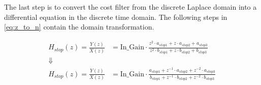     \startexplain
    \stopexplain

The last step is to convert the cost filter from the discrete Laplace domain into a differential equation in the discrete time domain. The following steps in \autoref{eq:z_to_n} contain the domain transformation.



\begin{subequations}\label{eq:bandstop_filter_peak_n}
\begin{alignat}{2}
 H_{stop}(z)=\frac{Y(z)}{X(z)} &=  \text{In_Gain} \cdot \frac{z^2 \cdot a_{stop1} + z \cdot a_{stop2} + a_{stop3}}{z^2 \cdot b_{stop1} + z \cdot b_{stop2} + b_{stop3}} \label{eq:bandstop_filter_peak_n_1}\\
 \Downarrow\\
 H_{stop}(z)=\frac{Y(z)}{X(z)} &=  \text{In_Gain} \cdot \frac{a_{stop1} + z^{-1} \cdot a_{stop2} +  z^{-2} \cdot a_{stop3}}{b_{stop1} + z^{-1} \cdot b_{stop2} +  z^{-2} \cdot b_{stop3}}  \label{eq:bandstop_filter_peak_n_2}
\end{alignat}
\end{subequations}


